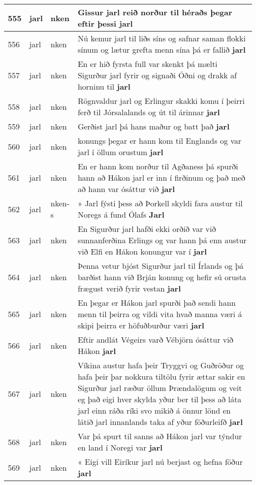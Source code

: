 \documentclass{article}
\begin{document}
\begin{longtable}{p{1cm}|p{1cm}|p{1cm}|p{13cm}}
\hline
555&jarl&nken&Gissur jarl reið norður til héraðs þegar eftir þessi \textbf{jarl} \\
\hline
556&jarl&nken&Nú kemur jarl til liðs síns og safnar saman flokki sínum og lætur grefta menn sína þá er fallið \textbf{jarl} \\
\hline
557&jarl&nken&En er hið fyrsta full var skenkt þá mælti Sigurður jarl fyrir og signaði Óðni og drakk af horninu til \textbf{jarl} \\
\hline
558&jarl&nken&Rögnvaldur jarl og Erlingur skakki komu í þeirri ferð til Jórsalalands og út til árinnar \textbf{jarl} \\
\hline
559&jarl&nken&Gerðist jarl þá hans maður og batt það \textbf{jarl} \\
\hline
560&jarl&nken&konungs þegar er hann kom til Englands og var jarl í öllum orustum \textbf{jarl} \\
\hline
561&jarl&nken&En er hann kom norður til Agðaness þá spurði hann að Hákon jarl er inn í firðinum og það með að hann var ósáttur við \textbf{jarl} \\
\hline
562&jarl&nken-s&» Jarl fýsti þess að Þorkell skyldi fara austur til Noregs á fund Ólafs \textbf{Jarl} \\
\hline
563&jarl&nken&En Sigurður jarl hafði ekki orðið var við sunnanferðina Erlings og var hann þá enn austur við Elfi en Hákon konungur var í \textbf{jarl} \\
\hline
564&jarl&nken&Þenna vetur bjóst Sigurður jarl til Írlands og þá barðist hann við Brján konung og hefir sú orusta frægust verið fyrir vestan \textbf{jarl} \\
\hline
565&jarl&nken&En þegar er Hákon jarl spurði það sendi hann menn til þeirra og vildi vita hvað manna væri á skipi þeirra er höfuðburður væri \textbf{jarl} \\
\hline
566&jarl&nken&Eftir andlát Végeirs varð Vébjörn ósáttur við Hákon \textbf{jarl} \\
\hline
567&jarl&nken&Víkina austur hafa þeir Tryggvi og Guðröður og hafa þeir þar nokkura tiltölu fyrir ættar sakir en Sigurður jarl ræður öllum Þrændalögum og veit eg það eigi hver skylda yður ber til þess að láta jarl einn ráða ríki svo mikið á önnur lönd en látið jarl innanlands taka af yður föðurleifð \textbf{jarl} \\
\hline
568&jarl&nken&Var þá spurt til sanns að Hákon jarl var týndur en land í Noregi var \textbf{jarl} \\
\hline
569&jarl&nken&« Eigi vill Eiríkur jarl nú berjast og hefna föður \textbf{jarl} \\

\end{longtable}
\end{document}
